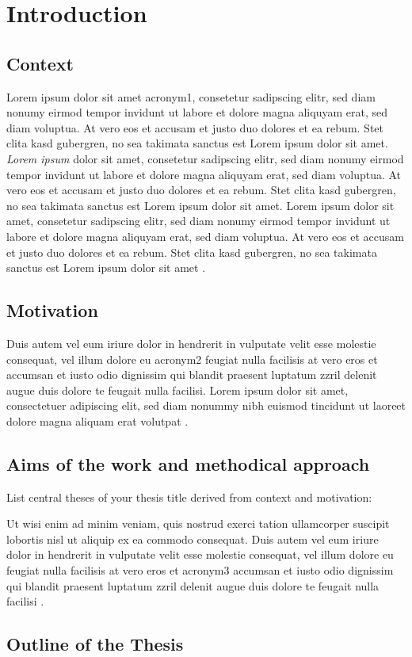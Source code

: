\chapter{Introduction}
\setcounter{page}{1}

\section{Context}
Lorem ipsum dolor sit amet \acrfull{acronym1}, consetetur sadipscing elitr, sed diam nonumy eirmod tempor invidunt ut labore et dolore magna aliquyam erat, sed diam voluptua. At vero eos et accusam et justo duo dolores et ea rebum. Stet clita kasd gubergren, no sea takimata sanctus est Lorem ipsum dolor sit amet. \textit{Lorem ipsum} dolor sit amet, consetetur sadipscing elitr, sed diam nonumy eirmod tempor invidunt ut labore et dolore magna aliquyam erat, sed diam voluptua. At vero eos et accusam et justo duo dolores et ea rebum. Stet clita kasd gubergren, no sea takimata sanctus est Lorem ipsum dolor sit amet. Lorem ipsum dolor sit amet, consetetur sadipscing elitr, sed diam nonumy eirmod tempor invidunt ut labore et dolore magna aliquyam erat, sed diam voluptua. At vero eos et accusam et justo duo dolores et ea rebum. Stet clita kasd gubergren, no sea takimata sanctus est Lorem ipsum dolor sit amet \cite{KHF17_Acoustic_Event_Classification_Using_Convolutional_Neural_Networks}. 

\section{Motivation}
Duis autem vel eum iriure dolor in hendrerit in vulputate velit esse molestie consequat, vel illum dolore eu \acrfull{acronym2} feugiat nulla facilisis at vero eros et accumsan et iusto odio dignissim qui blandit praesent luptatum zzril delenit augue duis dolore te feugait nulla facilisi. Lorem ipsum dolor sit amet, consectetuer adipiscing elit, sed diam nonummy nibh euismod tincidunt ut laoreet dolore magna aliquam erat volutpat \cite{Pic15_Environmental_Sound_Classification_with_Convolutional_Neural_Networks}. 

\section{Aims of the work and methodical approach}
List  central theses of your thesis title derived from context and motivation:

Ut wisi enim ad minim veniam, quis nostrud exerci tation ullamcorper suscipit lobortis nisl ut aliquip ex ea commodo consequat. Duis autem vel eum iriure dolor in hendrerit in vulputate velit esse molestie consequat, vel illum dolore eu feugiat nulla facilisis at vero eros et \acrfull{acronym3} accumsan et iusto odio dignissim qui blandit praesent luptatum zzril delenit augue duis dolore te feugait nulla facilisi \cite{SAP17_Unsupervised_Filterbank_Learning_Using_Convolutional_Restricted_Boltzmann}.

\section{Outline of the Thesis}




